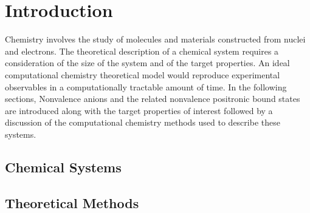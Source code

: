 \chapter{Introduction}

Chemistry involves the study of molecules and materials constructed from nuclei and electrons.
The theoretical description of a chemical system requires a consideration of the size of the system and of the target properties.
An ideal computational chemistry theoretical model would reproduce experimental observables in a computationally tractable amount of time.
In the following sections, Nonvalence anions and the related nonvalence positronic bound states are introduced along with the target properties of interest followed by a discussion of the computational chemistry methods used to describe these systems.

\section{Chemical Systems}



\section{Theoretical Methods}








